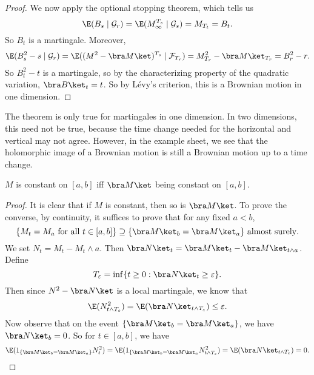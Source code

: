 \documentclass[a4paper]{article}
\begin{document}
\begin{proof}
  We now apply the optional stopping theorem, which tells us
  \[
    \E (B_s \mid \mathcal{G}_r) = \E (M^{T_s}_\infty \mid \mathcal{G}_s) = M_{T_t} = B_t.
  \]
  So $B_t$ is a martingale. Moreover,
  \[
    \E (B_s^2 - s \mid \mathcal{G}_r) = \E ((M^2 - \bra M\ket)^{T_s} \mid \mathcal{F}_{T_r}) = M_{T_r}^2 - \bra M\ket_{T_r} = B^2_r - r.
  \]
  So $B^2_t - t$ is a martingale, so by the characterizing property of the quadratic variation, $\bra B\ket_t = t$. So by L\'evy's criterion, this is a Brownian motion in one dimension.
\end{proof}

The theorem is only true for martingales in one dimension. In two dimensions, this need not be true, because the time change needed for the horizontal and vertical may not agree. However, in the example sheet, we see that the holomorphic image of a Brownian motion is still a Brownian motion up to a time change.

\begin{lemma}
  $M$ is constant on $[a, b]$ iff $\bra M\ket$ being constant on $[a, b]$.
\end{lemma}

\begin{proof}
  It is clear that if $M$ is constant, then so is $\bra M\ket$. To prove the converse, by continuity, it suffices to prove that for any fixed $a < b$,
  \[
    \{M_t = M_a \text{ for all }t \in [a, b]\} \supseteq \{\bra M\ket_b = \bra M\ket_a\}\text{ almost surely}.
  \]
  We set $N_t = M_t - M_t \wedge a$. Then $\bra N\ket_t = \bra M\ket_t - \bra M\ket_{t \wedge a}$. Define
  \[
    T_\varepsilon = \inf \{t \geq 0: \bra N\ket_t \geq \varepsilon\}.
  \]
  Then since $N^2 - \bra N\ket$ is a local martingale, we know that
  \[
    \E(N_{t \wedge T_\varepsilon}^2) = \E (\bra N\ket_{t \wedge T_\varepsilon})\leq \varepsilon.
  \]
  Now observe that on the event $\{\bra M\ket_b = \bra M\ket_a\}$, we have $\bra N\ket_b = 0$. So for $t \in [a, b]$, we have
  \[
    \E(1_{\{\bra M\ket_b = \bra M\ket_a\}} N_t^2) = \E(1_{\{\bra M\ket_b = \bra M\ket_a} N_{t \wedge T_\varepsilon}^2)= \E(\bra N\ket_{t \wedge T_\varepsilon}) = 0.\qedhere
  \]
\end{proof}
\end{document}
